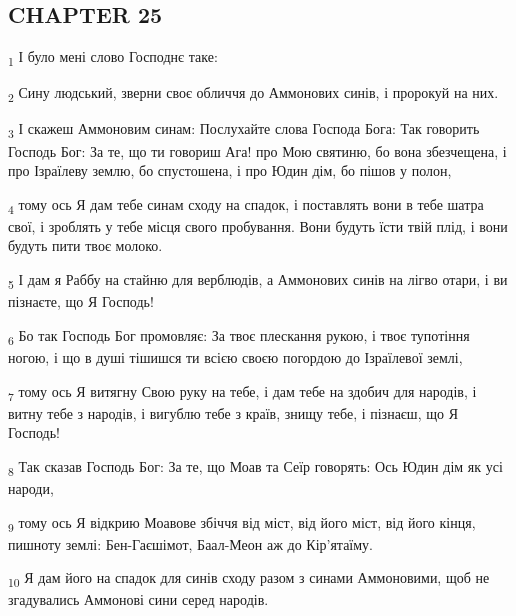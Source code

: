 \subsection{CHAPTER 25}
\begin{tcolorbox}
\textsubscript{1} І було мені слово Господнє таке:
\end{tcolorbox}
\begin{tcolorbox}
\textsubscript{2} Сину людський, зверни своє обличчя до Аммонових синів, і пророкуй на них.
\end{tcolorbox}
\begin{tcolorbox}
\textsubscript{3} І скажеш Аммоновим синам: Послухайте слова Господа Бога: Так говорить Господь Бог: За те, що ти говориш Ага! про Мою святиню, бо вона збезчещена, і про Ізраїлеву землю, бо спустошена, і про Юдин дім, бо пішов у полон,
\end{tcolorbox}
\begin{tcolorbox}
\textsubscript{4} тому ось Я дам тебе синам сходу на спадок, і поставлять вони в тебе шатра свої, і зроблять у тебе місця свого пробування. Вони будуть їсти твій плід, і вони будуть пити твоє молоко.
\end{tcolorbox}
\begin{tcolorbox}
\textsubscript{5} І дам я Раббу на стайню для верблюдів, а Аммонових синів на лігво отари, і ви пізнаєте, що Я Господь!
\end{tcolorbox}
\begin{tcolorbox}
\textsubscript{6} Бо так Господь Бог промовляє: За твоє плескання рукою, і твоє тупотіння ногою, і що в душі тішишся ти всією своєю погордою до Ізраїлевої землі,
\end{tcolorbox}
\begin{tcolorbox}
\textsubscript{7} тому ось Я витягну Свою руку на тебе, і дам тебе на здобич для народів, і витну тебе з народів, і вигублю тебе з країв, знищу тебе, і пізнаєш, що Я Господь!
\end{tcolorbox}
\begin{tcolorbox}
\textsubscript{8} Так сказав Господь Бог: За те, що Моав та Сеїр говорять: Ось Юдин дім як усі народи,
\end{tcolorbox}
\begin{tcolorbox}
\textsubscript{9} тому ось Я відкрию Моавове збіччя від міст, від його міст, від його кінця, пишноту землі: Бен-Гаєшімот, Баал-Меон аж до Кір'ятаїму.
\end{tcolorbox}
\begin{tcolorbox}
\textsubscript{10} Я дам його на спадок для синів сходу разом з синами Аммоновими, щоб не згадувались Аммонові сини серед народів.
\end{tcolorbox}
